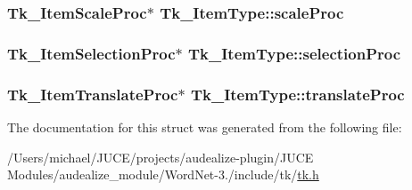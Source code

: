 \subsubsection[{\texorpdfstring{scale\+Proc}{scaleProc}}]{\setlength{\rightskip}{0pt plus 5cm}Tk\+\_\+\+Item\+Scale\+Proc$\ast$ Tk\+\_\+\+Item\+Type\+::scale\+Proc}\hypertarget{struct_tk___item_type_a7ff690ba7376afe6202e9706eff28345}{}\label{struct_tk___item_type_a7ff690ba7376afe6202e9706eff28345}
\subsubsection[{\texorpdfstring{selection\+Proc}{selectionProc}}]{\setlength{\rightskip}{0pt plus 5cm}Tk\+\_\+\+Item\+Selection\+Proc$\ast$ Tk\+\_\+\+Item\+Type\+::selection\+Proc}\hypertarget{struct_tk___item_type_ac643afb8df2a00d9ab157ae40c6bfbe6}{}\label{struct_tk___item_type_ac643afb8df2a00d9ab157ae40c6bfbe6}
\subsubsection[{\texorpdfstring{translate\+Proc}{translateProc}}]{\setlength{\rightskip}{0pt plus 5cm}Tk\+\_\+\+Item\+Translate\+Proc$\ast$ Tk\+\_\+\+Item\+Type\+::translate\+Proc}\hypertarget{struct_tk___item_type_abf1eac491b529a71298b1ee73f6dd62f}{}\label{struct_tk___item_type_abf1eac491b529a71298b1ee73f6dd62f}


The documentation for this struct was generated from the following file\+:\begin{DoxyCompactItemize}
\item 
/\+Users/michael/\+J\+U\+C\+E/projects/audealize-\/plugin/\+J\+U\+C\+E Modules/audealize\+\_\+module/\+Word\+Net-\/3./include/tk/\hyperlink{tk_8h}{tk.\+h}\end{DoxyCompactItemize}
